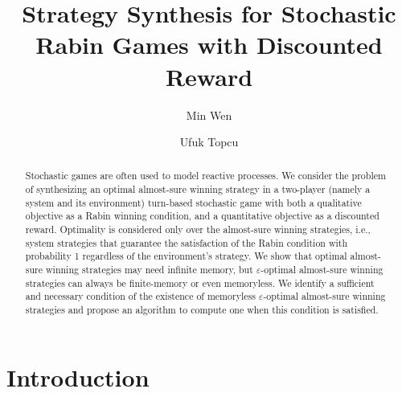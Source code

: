 \documentclass[runningheads,a4paper]{llncs}
\begin{document}
\mainmatter  

\title{Strategy Synthesis for Stochastic Rabin Games with Discounted Reward}


\author{Min Wen\and Ufuk Topcu}





\maketitle


\begin{abstract}


Stochastic games are often used to model reactive processes. We consider the problem of synthesizing an optimal almost-sure winning strategy in a two-player (namely a system and its environment) turn-based stochastic game with both a qualitative objective as a Rabin winning condition, and a quantitative objective as a discounted reward. Optimality is considered only over the almost-sure winning strategies, i.e., system strategies that guarantee the satisfaction of the Rabin condition with probability 1 regardless of the environment's strategy. We show that optimal almost-sure winning strategies may need infinite memory, but $\varepsilon$-optimal almost-sure winning strategies can always be finite-memory or even memoryless. We identify a sufficient and necessary condition of the existence of memoryless $\varepsilon$-optimal almost-sure winning strategies and propose an algorithm to compute one when this condition is satisfied. 





\end{abstract}

\section{Introduction}
\end{document}
